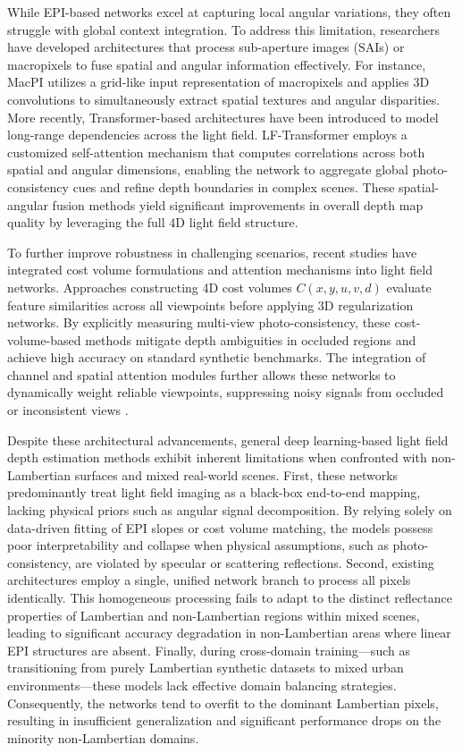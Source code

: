 While EPI-based networks excel at capturing local angular variations, they often struggle with global context integration. To address this limitation, researchers have developed architectures that process sub-aperture images (SAIs) or macropixels to fuse spatial and angular information effectively. For instance, MacPI utilizes a grid-like input representation of macropixels and applies 3D convolutions to simultaneously extract spatial textures and angular disparities. More recently, Transformer-based architectures have been introduced to model long-range dependencies across the light field. LF-Transformer employs a customized self-attention mechanism that computes correlations across both spatial and angular dimensions, enabling the network to aggregate global photo-consistency cues and refine depth boundaries in complex scenes. These spatial-angular fusion methods yield significant improvements in overall depth map quality by leveraging the full 4D light field structure.

To further improve robustness in challenging scenarios, recent studies have integrated cost volume formulations and attention mechanisms into light field networks. Approaches constructing 4D cost volumes $C(x, y, u, v, d)$ evaluate feature similarities across all viewpoints before applying 3D regularization networks. By explicitly measuring multi-view photo-consistency, these cost-volume-based methods mitigate depth ambiguities in occluded regions and achieve high accuracy on standard synthetic benchmarks. The integration of channel and spatial attention modules further allows these networks to dynamically weight reliable viewpoints, suppressing noisy signals from occluded or inconsistent views .

Despite these architectural advancements, general deep learning-based light field depth estimation methods exhibit inherent limitations when confronted with non-Lambertian surfaces and mixed real-world scenes. First, these networks predominantly treat light field imaging as a black-box end-to-end mapping, lacking physical priors such as angular signal decomposition. By relying solely on data-driven fitting of EPI slopes or cost volume matching, the models possess poor interpretability and collapse when physical assumptions, such as photo-consistency, are violated by specular or scattering reflections. Second, existing architectures employ a single, unified network branch to process all pixels identically. This homogeneous processing fails to adapt to the distinct reflectance properties of Lambertian and non-Lambertian regions within mixed scenes, leading to significant accuracy degradation in non-Lambertian areas where linear EPI structures are absent. Finally, during cross-domain training—such as transitioning from purely Lambertian synthetic datasets to mixed urban environments—these models lack effective domain balancing strategies. Consequently, the networks tend to overfit to the dominant Lambertian pixels, resulting in insufficient generalization and significant performance drops on the minority non-Lambertian domains.

